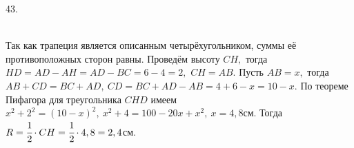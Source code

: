 43. \begin{figure}[ht!]
\end{figure}\\
Так как трапеция является описанным четырёхугольником, суммы её противоположных сторон равны. Проведём высоту $CH,$ тогда $HD=AD-AH=AD-BC=6-4=2,$ $CH=AB.$ Пусть $AB=x,$ тогда $AB+CD=BC+AD,\ CD=BC+AD-AB=4+6-x=10-x.$ По теореме Пифагора для треугольника $CHD$ имеем $x^2+2^2=(10-x)^2,\ x^2+4=100-20x+x^2,\ x=4,8$см. Тогда $R=\cfrac{1}{2}\cdot CH=\cfrac{1}{2}\cdot 4,8=2,4$см.\\

